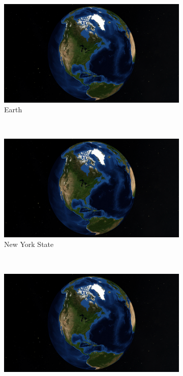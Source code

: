 \begin{figure}[h]
    \centering
    \begin{subfigure}[bt]{0.31\textwidth}
        \includegraphics[width=\textwidth]{figures/results/os_view_earth.png}
        \caption{Earth}
    \end{subfigure}
    ~
    \begin{subfigure}[bt]{0.31\textwidth}
        \includegraphics[width=\textwidth]{figures/results/os_view_earth.png}
        \caption{New York State}
    \end{subfigure}
    ~
    \begin{subfigure}[bt]{0.31\textwidth}
        \includegraphics[width=\textwidth]{figures/results/os_view_earth.png}

\end{subfigure}
\end{figure}
